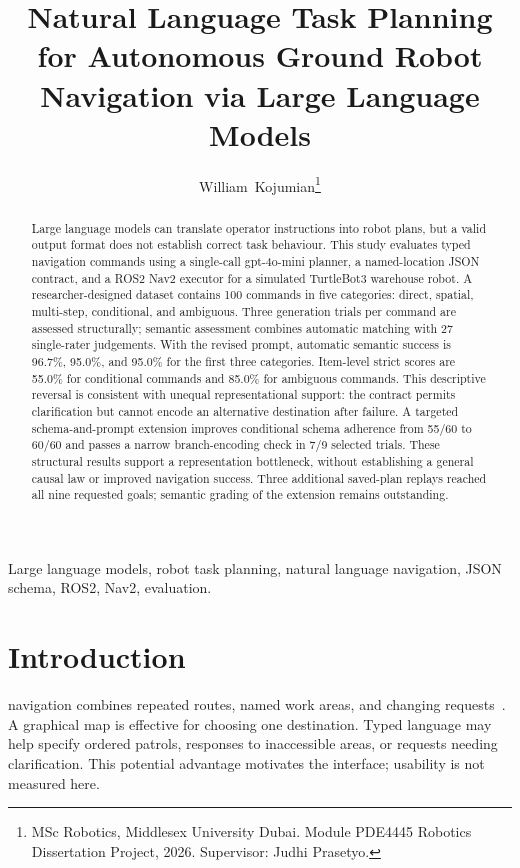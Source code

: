 \documentclass[journal]{IEEEtran}
\begin{document}
\title{Natural Language Task Planning for Autonomous Ground Robot Navigation via Large Language Models}
\author{William~Kojumian\thanks{MSc Robotics, Middlesex University Dubai. Module PDE4445 Robotics Dissertation Project, 2026. Supervisor: Judhi Prasetyo.}}
\maketitle

\begin{abstract}
Large language models can translate operator instructions into robot plans, but a valid output format does not establish correct task behaviour. This study evaluates typed navigation commands using a single-call gpt-4o-mini planner, a named-location JSON contract, and a ROS2 Nav2 executor for a simulated TurtleBot3 warehouse robot. A researcher-designed dataset contains 100 commands in five categories: direct, spatial, multi-step, conditional, and ambiguous. Three generation trials per command are assessed structurally; semantic assessment combines automatic matching with 27 single-rater judgements. With the revised prompt, automatic semantic success is 96.7\%, 95.0\%, and 95.0\% for the first three categories. Item-level strict scores are 55.0\% for conditional commands and 85.0\% for ambiguous commands. This descriptive reversal is consistent with unequal representational support: the contract permits clarification but cannot encode an alternative destination after failure. A targeted schema-and-prompt extension improves conditional schema adherence from 55/60 to 60/60 and passes a narrow branch-encoding check in 7/9 selected trials. These structural results support a representation bottleneck, without establishing a general causal law or improved navigation success. Three additional saved-plan replays reached all nine requested goals; semantic grading of the extension remains outstanding.
\end{abstract}
\begin{IEEEkeywords}
Large language models, robot task planning, natural language navigation, JSON schema, ROS2, Nav2, evaluation.
\end{IEEEkeywords}

\section{Introduction}
 navigation combines repeated routes, named work areas, and changing requests~\cite{pallottino2026warehouse}. A graphical map is effective for choosing one destination. Typed language may help specify ordered patrols, responses to inaccessible areas, or requests needing clarification. This potential advantage motivates the interface; usability is not measured here.
\end{document}
